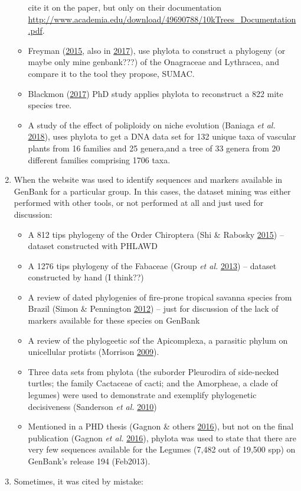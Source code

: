 \documentclass[]{article}
\providecommand{\tightlist}{%
  \setlength{\itemsep}{0pt}\setlength{\parskip}{0pt}}
\begin{document}
\begin{enumerate}
\begin{itemize}
    cite it on the paper, but only on their documentation \url{http://www.academia.edu/download/49690788/10kTrees_Documentation.pdf}.
  \item
    Freyman (\protect\hyperlink{ref-freyman2015sumac}{2015}, also in \protect\hyperlink{ref-freyman2017phylogenetic}{2017}), use phylota to construct
    a phylogeny (or maybe only mine genbank???) of the Onagraceae and Lythracea,
    and compare it to the tool they propose, SUMAC.
  \item
    Blackmon (\protect\hyperlink{ref-blackmon2017synthesis}{2017}) PhD study applies phylota to reconstruct a 822 mite
    species tree.
  \item
    A study of the effect of poliploidy on niche evolution (Baniaga \emph{et al.} \protect\hyperlink{ref-baniaga2018polyploid}{2018}),
    uses phylota to get a DNA data set for 132 unique taxa of vascular plants from
    16 families and 25 genera,and a tree of 33 genera from 20 different families
    comprising 1706 taxa.
  \end{itemize}
\item
  When the website was used to identify sequences and markers available in
  GenBank for a particular group. In this cases, the dataset mining was either performed
  with other tools, or not performed at all and just used for discussion:

  \begin{itemize}
  \tightlist
  \item
    A 812 tips phylogeny of the Order Chiroptera (Shi \& Rabosky \protect\hyperlink{ref-shi2015speciation}{2015}) -- dataset
    constructed with PHLAWD
  \item
    A 1276 tips phylogeny of the Fabaceae (Group \emph{et al.} \protect\hyperlink{ref-legume2013legume}{2013}) -- dataset constructed
    by hand (I think??)
  \item
    A review of dated phylogenies of fire-prone tropical savanna species from Brazil
    (Simon \& Pennington \protect\hyperlink{ref-simon2012cerrado}{2012}) -- just for discussion of the lack of markers available for
    these species on GenBank
  \item
    A review of the phylogeetic sof the Apicomplexa, a parasitic phylum on unicellular
    protists (Morrison \protect\hyperlink{ref-morrison2009apicomplexa}{2009}).
  \item
    Three data sets from phylota (the suborder Pleurodira of side-necked turtles;
    the family Cactaceae of cacti; and the Amorpheae, a clade of legumes) were used
    to demonstrate and exemplify phylogenetic decisiveness (Sanderson \emph{et al.} \protect\hyperlink{ref-sanderson2010phylogenomics}{2010})
  \item
    Mentioned in a PHD thesis (Gagnon \& others \protect\hyperlink{ref-gagnon2016systematique}{2016}), but not on the final publication (Gagnon \emph{et al.} \protect\hyperlink{ref-gagnon2016new}{2016}),
    phylota was used to state that there are very few sequences available for the Legumes (7,482 out of 19,500 spp) on GenBank's release 194 (Feb2013).
  \end{itemize}
\item
  Sometimes, it was cited by mistake:


\end{enumerate}
\end{document}
